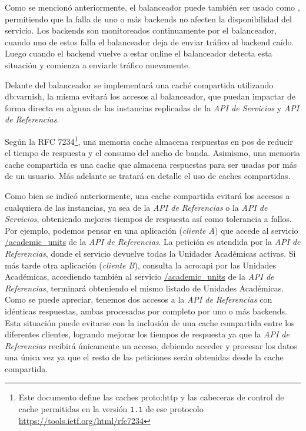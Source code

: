 Como se mencionó anteriormente, el balanceador puede también ser usado como , permitiendo que la falla de uno o más backends no afecten la disponibilidad del servicio. Los backends son monitoreados continuamente por el balanceador, cuando uno de estos falla el balanceador deja de enviar tráfico al backend caído. Luego cuando el backend vuelve a estar online el balanceador detecta esta situación y comienza a enviarle tráfico nuevamente.

Delante del balanceador se implementará una caché compartida utilizando \gls{db:varnish}, la misma evitará los accesos al balanceador, que puedan impactar de forma directa en alguna de las instancias replicadas de la \textit{API de Servicios} y \textit{API de Referencias}.

Según la RFC 7234\footnote{Este documento define las caches \gls{proto:http} y las cabeceras de control de cache permitidas en la versión \texttt{1.1} de ese protocolo\\\url{https://tools.ietf.org/html/rfc7234}}, una memoria cache almacena respuestas en pos de reducir el tiempo de respuesta y el consumo del ancho de banda. Asimismo, una memoria cache compartida es una cache que almacena respuestas para ser usadas por más de un usuario. Más adelante se tratará en detalle el uso de caches compartidas.

Como bien se indicó anteriormente, una cache compartida evitará los accesos a cualquiera de las instancias, ya sea de la \textit{API de Referencias} o la \textit{API de Servicios}, obteniendo mejores tiempos de respuesta así como tolerancia a fallos. Por ejemplo, podemos pensar en una aplicación (\textit{cliente A}) que accede al servicio \url{/academic_units} de la \textit{API de Referencias}. La petición es atendida por la \textit{API de Referencias}, donde el servicio devuelve todas la Unidades Académicas activas. Si más tarde otra aplicación (\textit{cliente B}), consulta la \gls{acro:api} por las Unidades Académicas, accediendo también al servicio \url{/academic_units} de la \textit{API de Referencias}, terminará obteniendo el mismo listado de Unidades Académicas. Como se puede apreciar, tenemos dos accesos a la \textit{API de Referencias} con idénticas respuestas, ambas procesadas por completo por uno o más backends. Esta situación puede evitarse con la inclusión de una cache compartida entre los diferentes clientes, logrando mejorar los tiempos de respuesta ya que la \textit{API de Referencias} recibirá únicamente un acceso, debiendo acceder y procesar los datos una única vez ya que el resto de las peticiones serán obtenidas desde la cache compartida.


